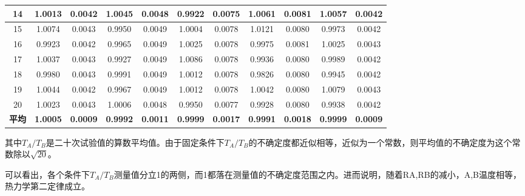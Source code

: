 \documentclass[10pt, a4paper]{article}
\begin{document}
\begin{table}[H]
\begin{tabular}{|c|c|c|c|c|c|c|c|c|c|c|}
      14    & 1.0013 & 0.0042 & 1.0045 & 0.0048 & 0.9922 & 0.0075 & 1.0061 & 0.0081 & 1.0057 & 0.0042 \\\hline
      15    & 1.0074 & 0.0043 & 0.9950 & 0.0049 & 1.0004 & 0.0078 & 1.0121 & 0.0080 & 0.9973 & 0.0042 \\\hline
      16    & 0.9923 & 0.0042 & 0.9965 & 0.0049 & 1.0025 & 0.0078 & 0.9975 & 0.0081 & 1.0025 & 0.0043 \\\hline
      17    & 1.0037 & 0.0043 & 0.9927 & 0.0049 & 1.0086 & 0.0078 & 0.9936 & 0.0080 & 0.9989 & 0.0042 \\\hline
      18    & 0.9980 & 0.0043 & 0.9991 & 0.0049 & 1.0012 & 0.0078 & 0.9826 & 0.0080 & 0.9945 & 0.0042 \\\hline
      19    & 1.0044 & 0.0042 & 0.9967 & 0.0049 & 1.0012 & 0.0078 & 1.0042 & 0.0080 & 1.0079 & 0.0043 \\\hline
      20    & 1.0023 & 0.0043 & 1.0006 & 0.0048 & 0.9950 & 0.0077 & 0.9928 & 0.0080 & 0.9938 & 0.0042 \\\hline
      \textbf{平均 }   & \textbf{1.0005} & \textbf{0.0009} & \textbf{0.9992 }& \textbf{0.0011 }&\textbf{ 0.9999} &\textbf{ 0.0017} & \textbf{0.9991} &\textbf{ 0.0018} & \textbf{0.9999} &\textbf{ 0.0009 }\\\hline
      \end{tabular}%
    \label{tab:改进的试验数据表}%
  \end{table}%
  
  其中$T_A/T_B$是二十次试验值的算数平均值。由于固定条件下$T_A/T_B$的不确定度都近似相等，近似为一个常数，则平均值的不确定度为这个常数除以$\sqrt{20}$。

  可以看出，各个条件下$T_A/T_B$测量值分立1的两侧，而1都落在测量值的不确定度范围之内。进而说明，随着RA,RB的减小，A,B温度相等，热力学第二定律成立。
\end{document}
